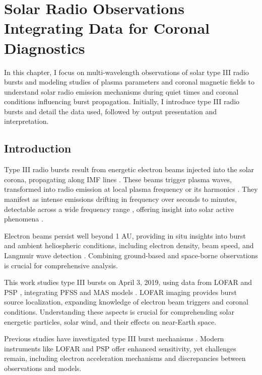 \chapter[Solar Radio Observations: Integrating Data for Coronal Diagnostics]{Solar Radio Observations\\\LARGE Integrating Data for Coronal Diagnostics}
\label{chapter3}
In this chapter, I focus on multi-wavelength observations of solar type III radio bursts and modeling studies of plasma parameters and coronal magnetic fields to understand solar radio emission mechanisms during quiet times and coronal conditions influencing burst propagation. Initially, I introduce type III radio bursts and detail the data used, followed by output presentation and interpretation.

\section{Introduction}
Type III radio bursts result from energetic electron beams injected into the solar corona, propagating along IMF lines \cite{ergun_1998, pick_radio_2006, reid_2020}. These beams trigger plasma waves, transformed into radio emission at local plasma frequency or its harmonics \cite{melrose_2017}. They manifest as intense emissions drifting in frequency over seconds to minutes, detectable across a wide frequency range \cite{wild_1950a, lecacheux_1989, bonnin_2008}, offering insight into solar active phenomena \cite{reid_2014, kontar_2017}.

Electron beams persist well beyond 1 AU, providing in situ insights into burst and ambient heliospheric conditions, including electron density, beam speed, and Langmuir wave detection \cite{dulk_1985, boudjada_2020, gurnett_1976, gurnett_1977, reid_2014}. Combining ground-based and space-borne observations is crucial for comprehensive analysis.

This work studies type III bursts on April 3, 2019, using data from LOFAR \cite{lofar_2013} and PSP \cite{fox_2016}, integrating PFSS and MAS models \cite{altschuler_1969, schatten_1969, mhd_1999}. LOFAR imaging provides burst source localization, expanding knowledge of electron beam triggers and coronal conditions. Understanding these aspects is crucial for comprehending solar energetic particles, solar wind, and their effects on near-Earth space.

Previous studies have investigated type III burst mechanisms \cite{chen_2013b, bonnin_2008, reiner_2009, saint_2012, morosan_2017, pulupa_2020, krupar_2020, cattell_2021, harra_2021, badman_2022}. Modern instruments like LOFAR and PSP offer enhanced sensitivity, yet challenges remain, including electron acceleration mechanisms and discrepancies between observations and models.

